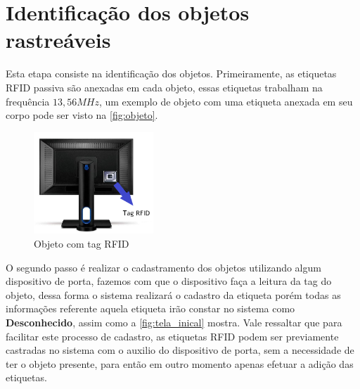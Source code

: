 \section{Identificação dos objetos rastreáveis}

Esta etapa consiste na identificação dos objetos. Primeiramente, as etiquetas RFID passiva são anexadas em cada objeto, essas etiquetas trabalham na frequência $13,56MHz$, um exemplo de objeto com uma etiqueta anexada em seu corpo pode ser visto na \autoref{fig:objeto}.
\begin{figure}[H]
              \caption{\label{fig:objeto}{Objeto com tag RFID}}
              \centering
              \includegraphics[width=0.4\textwidth]{Figuras/monitor.png}
\end{figure}

\par
O segundo passo é realizar o cadastramento dos objetos utilizando algum dispositivo de porta, fazemos com que o dispositivo faça a leitura da tag do objeto, dessa forma o sistema realizará o cadastro da etiqueta porém todas as informações referente aquela etiqueta irão constar no sistema como \textbf{Desconhecido}, assim como a \autoref{fig:tela_inical} mostra. Vale ressaltar que para facilitar este processo de cadastro, as etiquetas RFID podem ser previamente castradas no sistema com o auxilio do dispositivo de porta, sem a necessidade de ter o objeto presente, para então em outro momento apenas efetuar a adição das etiquetas.

